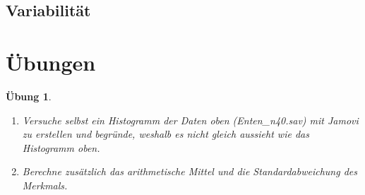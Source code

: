\documentclass[
]{book}
\providecommand{\tightlist}{%
  \setlength{\itemsep}{0pt}\setlength{\parskip}{0pt}}
\newtheorem{exercise}{Übung}
\begin{document}
\subsection{Variabilität}\label{variabilituxe4t}

\section{Übungen}\label{uxfcbungen}

\begin{exercise}
\leavevmode

\begin{enumerate}
\def\labelenumi{(\alph{enumi})}
\tightlist
\item
  Versuche selbst ein Histogramm der Daten oben (\emph{Enten\_n40.sav}) mit Jamovi zu erstellen und begründe, weshalb es nicht gleich aussieht wie das Histogramm oben.
\item
  Berechne zusätzlich das arithmetische Mittel und die Standardabweichung des Merkmals.
\end{enumerate}

\end{exercise}
\end{document}
